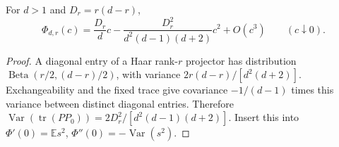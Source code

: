 \begin{corollary}
For $d>1$ and $D_r=r(d-r)$,
\begin{equation}
 \Phi_{d,r}(c)=\frac{D_r}{d}c-
       \frac{D_r^2}{d^2(d-1)(d+2)}c^2+O(c^3)
                         \qquad(c\downarrow0).
\end{equation}
\end{corollary}
\begin{proof}
A diagonal entry of a Haar rank-$r$ projector has distribution
$\operatorname{Beta}(r/2,(d-r)/2)$, with variance
$2r(d-r)/[d^2(d+2)]$. Exchangeability and the fixed trace give covariance
$-1/(d-1)$ times this variance between distinct diagonal entries.
Therefore $\operatorname{Var}(\operatorname{tr}(PP_0))=
2D_r^2/[d^2(d-1)(d+2)]$. Insert this into
$\Phi'(0)=\mathbb Es^2$, $\Phi''(0)=-\operatorname{Var}(s^2)$.
\end{proof}

